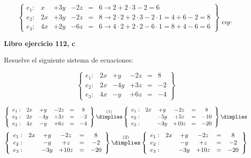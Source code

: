\documentclass[palatino,nosec]{Docencia}
\begin{document}
\begin{problem}
\[
\left\{\begin{array}{lccccl}
e_1: &x&+3y&-2z&=&6 \to 2+2·3-2 = 6\\
e_2: &2x&+3y&-2z&=&8 \to 2·2 + 2·3-2·1 = 4+6-2 = 8\\
e_3: &4x&+2y&-6z&=&6 \to 4·2+2·2-6·1 = 8+4-6 = 6  
\end{array}\right\} \begin{array}{c}\\\\\\\\\text{cqc}\end{array}
\]
\end{problem}


\newpage
\begin{problem}
\textbf{Libro ejercicio 112, c}

Resuelve el siguiente sistema de ecuaciones:

\[
\left\{\begin{array}{lccccc}
e_1: &	2x &	+	y &		- 2z &	= & 8 \\
e_2: &	2x &	-	4y &	+ 3z &	= & -2 \\
e_3: &	4x &	-	y &		+ 6z &	= & -4 
\end{array}\right\}
\]

\solution


\[
\left\{\begin{array}{lccccc}
e_1: &	2x &	+	y &		- 2z &	= & 8 \\
e_2: &	2x &	-	4y &	+ 3z &	= & -2 \\
e_3: &	4x &	-	y &		+ 6z &	= & -4 
\end{array}\right\}
\overset{(1)}{\dimplies}
\left\{\begin{array}{lccccc}
e_1: &	2x &	+	y &		- 2z &	= & 8 \\
e_2: &	   &	-	5y &	+ 5z &	= & -10\\
e_3: &	   &	-	3y &	+ 10z &	= & -20\\
\end{array}\right\}
\dimplies\]
\[
\left\{\begin{array}{lccccc}
e_1: &	2x &	+	y &		- 2z &	= & 8 \\
e_2: &	   &	-	y &		+  z &	= & -2\\
e_3: &	   &	-	3y &	+ 10z &	= & -20\\
\end{array}\right\}
\overset{(2)}{\dimplies}
\left\{\begin{array}{lccccc}
e_1: &	2x &	+	y &		- 2z &	= & 8 \\
e_2: &	   &	-	y &		+  z &	= & -2\\
e_3: &	   &	-	3y &	+ 10z &	= & -20\\
\end{array}\right\}
\]



\end{problem}
\end{document}
